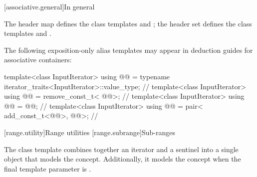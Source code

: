\documentclass{wg21}
\begin{document}
[associative.general]{In general}

\pnum
The header map defines the class templates  and
; the header set defines the class templates
 and .

\pnum
The following exposition-only alias templates may appear in deduction guides for associative containers:
\begin{codeblock}
    template<class InputIterator>
    using @@ =
    typename iterator_traits<InputIterator>::value_type;                // \expos
    template<class InputIterator>
    using @@ = remove_const_t<
    @@>;   // \expos
    template<class InputIterator>
    using @@ =
    @@;   // \expos
    template<class InputIterator>
    using @@ = pair<
    add_const_t<@@>,
    @@>;  // \expos
\end{codeblock}


[range.utility]{Range utilities}
[range.subrange]{Sub-ranges}

\pnum
The  class template combines together an
iterator and a sentinel into a single object that models the
 concept. Additionally, it models the
 concept when the final template parameter is
.
\end{document}
